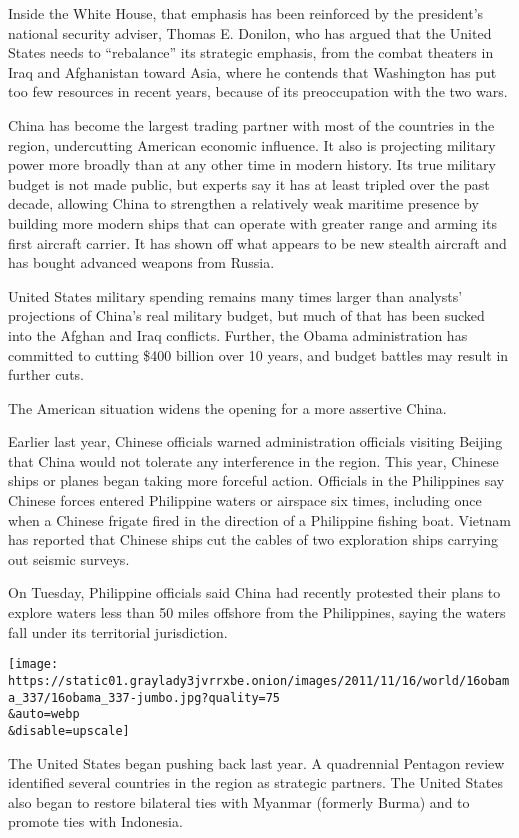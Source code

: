 Inside the White House, that emphasis has been reinforced by the
president's national security adviser, Thomas E. Donilon, who has argued
that the United States needs to ``rebalance'' its strategic emphasis,
from the combat theaters in Iraq and Afghanistan toward Asia, where he
contends that Washington has put too few resources in recent years,
because of its preoccupation with the two wars.

China has become the largest trading partner with most of the countries
in the region, undercutting American economic influence. It also is
projecting military power more broadly than at any other time in modern
history. Its true military budget is not made public, but experts say it
has at least tripled over the past decade, allowing China to strengthen
a relatively weak maritime presence by building more modern ships that
can operate with greater range and arming its first aircraft carrier. It
has shown off what appears to be new stealth aircraft and has bought
advanced weapons from Russia.

United States military spending remains many times larger than analysts'
projections of China's real military budget, but much of that has been
sucked into the Afghan and Iraq conflicts. Further, the Obama
administration has committed to cutting \$400 billion over 10 years, and
budget battles may result in further cuts.

The American situation widens the opening for a more assertive China.

Earlier last year, Chinese officials warned administration officials
visiting Beijing that China would not tolerate any interference in the
region. This year, Chinese ships or planes began taking more forceful
action. Officials in the Philippines say Chinese forces entered
Philippine waters or airspace six times, including once when a Chinese
frigate fired in the direction of a Philippine fishing boat. Vietnam has
reported that Chinese ships cut the cables of two exploration ships
carrying out seismic surveys.

On Tuesday, Philippine officials said China had recently protested their
plans to explore waters less than 50 miles offshore from the
Philippines, saying the waters fall under its territorial jurisdiction.

\texttt{[image: https://static01.graylady3jvrrxbe.onion/images/2011/11/16/world/16obama\_337/16obama\_337-jumbo.jpg?quality=75\\\&auto=webp\\\&disable=upscale]}

The United States began pushing back last year. A quadrennial Pentagon
review identified several countries in the region as strategic partners.
The United States also began to restore bilateral ties with Myanmar
(formerly Burma) and to promote ties with Indonesia.

